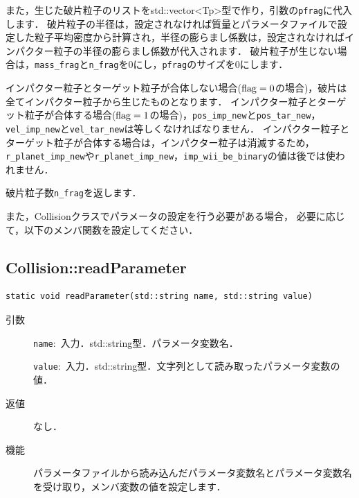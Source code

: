 \documentclass[12pt,a4paper,dvipdfmx]{jsarticle}
\begin{document}
\begin{description}
\begin{itemize}
\end{itemize}

また，生じた破片粒子のリストをstd::vector<Tp>型で作り，引数の\texttt{pfrag}に代入します．
破片粒子の半径は，設定されなければ質量とパラメータファイルで設定した粒子平均密度から計算され，半径の膨らまし係数は，設定されなければインパクター粒子の半径の膨らまし係数が代入されます．
破片粒子が生じない場合は，\texttt{mass\_frag}と\texttt{n\_frag}を0にし，\texttt{pfrag}のサイズを0にします．

インパクター粒子とターゲット粒子が合体しない場合(${\rm flag}=0$の場合)，破片は全てインパクター粒子から生じたものとなります．
インパクター粒子とターゲット粒子が合体する場合(${\rm flag}=1$の場合)，\texttt{pos\_imp\_new}と\texttt{pos\_tar\_new}，\texttt{vel\_imp\_new}と\texttt{vel\_tar\_new}は等しくなければなりません．
インパクター粒子とターゲット粒子が合体する場合は，インパクター粒子は消滅するため，\texttt{r\_planet\_imp\_new}や\texttt{r\_planet\_imp\_new}，\texttt{imp\_wii\_be\_binary}の値は後では使われません．

破片粒子数\texttt{n\_frag}を返します．
\end{description}


また，Collisionクラスでパラメータの設定を行う必要がある場合，
必要に応じて，以下のメンバ関数を設定してください．
\subsection{Collision::readParameter}

\begin{screen}
\begin{verbatim}
static void readParameter(std::string name, std::string value)
\end{verbatim}
\end{screen}

\begin{description}
\item[引数]

\texttt{name}:\ 入力．std::string型．パラメータ変数名．

\texttt{value}:\ 入力．std::string型．文字列として読み取ったパラメータ変数の値．

\item[返値]

なし．
\item[機能]

パラメータファイルから読み込んだパラメータ変数名とパラメータ変数名を受け取り，メンバ変数の値を設定します．
\end{description}
\end{document}
